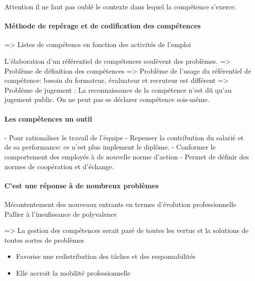 Attention il ne faut pas oublé le contexte dans lequel la compétence s'exerce. 

\paragraph{Méthode de repérage et de codification des compétences}



=> Listes de compétencs en fonction des activités de l'emploi

L'élaboration d'un référentiel de compétences soulèvent des problèmes. 
=> Problème de définition des compétences 
=> Problème de l'usage du référentiel de compétence: besoin du formateur, évaluateur et recruteur est différent
=> Problème de jugement : La reconnaissance de la compétence n'est dû qu'au jugement public. On ne peut pas se déclarer compétence sois-même. 



\paragraph{Les compétences un outil}
- Pour rationaliser le travail de l'équipe
- Repenser la contribution du salarié et de sa performance: ce n'est plus implement le diplôme. 
- Conformer le comportement des employés à de nouvelle norme d'action 
- Permet de définir des normes de coopération et d'échange. 

\paragraph{C'est une réponse à de nombreux problèmes}
Mécontentement des nouveaux entrants en termes d'évolution professionnelle
Pallier à l'insufissance de polyvalence

=> La gestion des compétences serait paré de toutes les vertus et la solutions de toutes sortes de problèmes

\begin{itemize}
    \item Favorise une redistribution des tâches et des responsabilités
    \item Elle accroit la mobilité professionnelle
\end{itemize}



